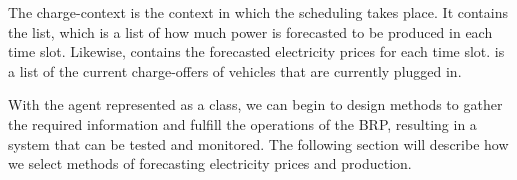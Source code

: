 The charge-context is the context in which the scheduling takes place. It contains the  list, which is a list of how much power is forecasted to be produced in each time slot. Likewise,  contains the forecasted electricity prices for each time slot.  is a list of the current charge-offers of vehicles that are currently plugged in. 

With the agent represented as a class, we can begin to design methods to gather the required information and fulfill the operations of the BRP, resulting in a system that can be tested and monitored. The following section will describe how we select methods of forecasting electricity prices and production.
